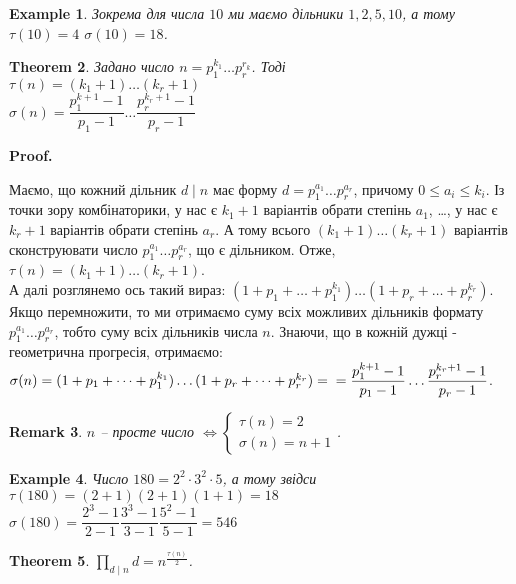 \documentclass[a4paper, 14pt]{extarticle}
\makeatletter
\theoremstyle{theoremdd}
\newtheorem{theorem}{Theorem}[subsection]
\theoremstyle{theoremdd}
\theoremstyle{theoremdd}
\theoremstyle{theoremdd}
\newtheorem{example}[theorem]{Example}
\theoremstyle{theoremdd}
\theoremstyle{theoremdd}
\newtheorem{remark}[theorem]{Remark}
\theoremstyle{theoremdd}
\theoremstyle{theoremdd}
\def\qed{$\blacksquare$}
\renewenvironment{proof}[1][Proof.\\]{\par
\pushQED{\hfill \qed}%
\normalfont \topsep6\p@\@plus6\p@\relax
\trivlist
\item\relax
{\bfseries
#1\@addpunct{.}}\hspace\labelsep\ignorespaces
}{%
\popQED\endtrivlist\@endpefalse
}
\makeatother
\begin{document}
\begin{example}
Зокрема для числа $10$ ми маємо дільники $1,2,5,10$, а тому $\tau(10) = 4$ \qquad $\sigma(10) = 18$.
\end{example}

\begin{theorem}
Задано число $n = p_1^{k_1} \dots p_r^{r_k}$. Тоді\\
$\tau(n) = (k_1+1) \dots (k_r+1)$\\
$\sigma(n) = \dfrac{p_1^{k+1}-1}{p_1-1} \dots \dfrac{p_r^{k_r+1}-1}{p_r-1}$
\end{theorem}

\begin{proof}
Маємо, що кожний дільник $d \mid n$ має форму $d = p_1^{a_1} \dots p_r^{a_r}$, причому $0 \leq a_i \leq k_i$. Із точки зору комбінаторики, у нас є $k_1+1$ варіантів обрати степінь $a_1$, \dots, у нас є $k_r+1$ варіантів обрати степінь $a_r$. А тому всього $(k_1+1) \dots (k_r+1)$ варіантів сконструювати число $p_1^{a_1} \dots p_r^{a_r}$, що є дільником. Отже, $\tau(n) = (k_1+1) \dots (k_r+1)$.
\bigskip \\
А далі розглянемо ось такий вираз: $(1+p_1+\dots +p_1^{k_1}) \dots (1+p_r+\dots+p_r^{k_r})$. Якщо перемножити, то ми отримаємо суму всіх можливих дільників формату $p_1^{a_1} \dots p_r^{a_r}$, тобто суму всіх дільників числа $n$. Знаючи, що в кожній дужці - геометрична прогресія, отримаємо:\\
$\sigma(n) = (1+p_1+\dots +p_1^{k_1}) \dots (1+p_r+\dots+p_r^{k_r}) = \\ = \dfrac{p_1^{k+1}-1}{p_1-1} \dots \dfrac{p_r^{k_r+1}-1}{p_r-1}$.
\end{proof}

\begin{remark}
$n$ -- просте число $\iff \begin{cases} \tau(n) =2 \\ \sigma(n) = n+1 \end{cases}$.
\end{remark}

\begin{example}
Число $180 = 2^2 \cdot 3^2 \cdot 5$, а тому звідси\\
$\tau(180) = (2+1)(2+1)(1+1) = 18$\\
$\sigma(180) = \dfrac{2^3-1}{2-1} \dfrac{3^3-1}{3-1} \dfrac{5^2-1}{5-1} = 546$
\end{example}

\begin{theorem}
$\displaystyle\prod_{d \mid n} d = n^{\frac{\tau(n)}{2}}$.
\end{theorem}
\end{document}

